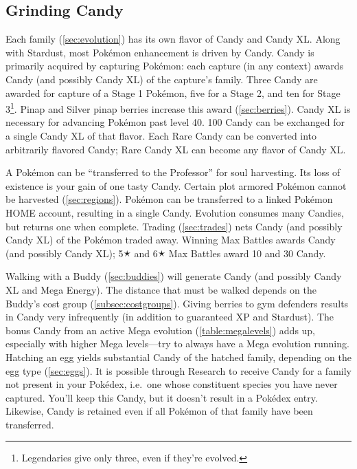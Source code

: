 \subsection{Grinding Candy\label{subsec:getcandy}}
Each family (\autoref{sec:evolution}) has its own flavor of Candy and Candy XL\@.
Along with Stardust, most Pokémon enhancement is driven by Candy.
Candy is primarily acquired by capturing Pokémon: each capture (in any context)
  awards Candy (and possibly Candy XL) of the capture's family.
Three Candy are awarded for capture of a Stage 1 Pokémon, five for a Stage 2,
  and ten for Stage 3\footnote{Legendaries give only three, even if they're evolved.}.
Pinap and Silver pinap berries increase this award (\autoref{sec:berries}).
Candy XL is necessary for advancing Pokémon past level 40.
100 Candy can be exchanged for a single Candy XL of that flavor.
Each Rare Candy can be converted into arbitrarily flavored Candy; Rare Candy XL can become any flavor of Candy XL\@.

A Pokémon can be ``transferred to the Professor'' for soul harvesting.
Its loss of existence is your gain of one tasty Candy.
Certain plot armored Pokémon cannot be harvested (\autoref{sec:regions}).
Pokémon can be transferred to a linked Pokémon HOME account, resulting in a single Candy.
Evolution consumes many Candies, but returns one when complete.
Trading (\autoref{sec:trades}) nets Candy (and possibly Candy XL) of the Pokémon traded away.
Winning Max Battles awards Candy (and possibly Candy XL);
 5🟉 and 6🟉 Max Battles award 10 and 30 Candy.

Walking with a Buddy (\autoref{sec:buddies}) will generate Candy (and possibly Candy XL and Mega Energy).
The distance that must be walked depends on the Buddy's cost group (\autoref{subsec:costgroups}).
Giving berries to gym defenders results in Candy very infrequently (in addition to guaranteed XP and Stardust).
The bonus Candy from an active Mega evolution (\autoref{table:megalevels}) adds up, especially
 with higher Mega levels---try to always have a Mega evolution running.
Hatching an egg yields substantial Candy of the hatched family, depending on the egg type (\autoref{sec:eggs}).
It is possible through Research to receive Candy for a family not present in
  your Pokédex, i.e.\ one whose constituent species you have never captured.
You'll keep this Candy, but it doesn't result in a Pokédex entry.
Likewise, Candy is retained even if all Pokémon of that family have been transferred.
